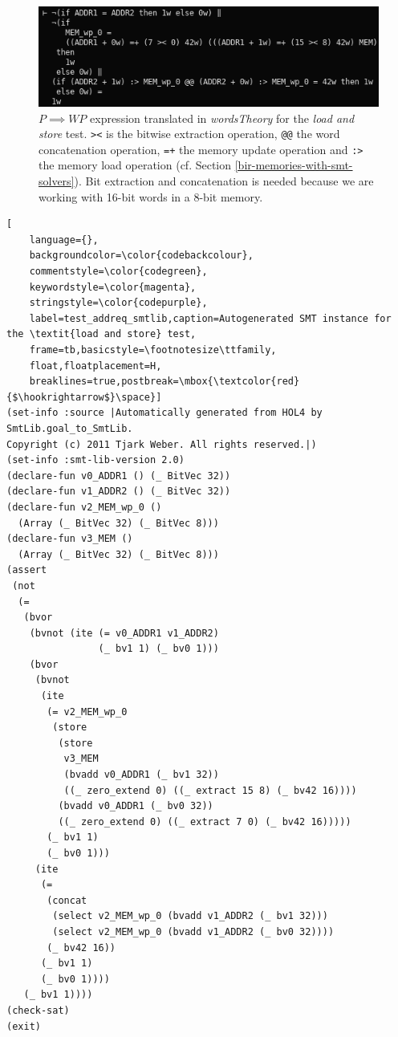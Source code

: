 \documentclass{kththesis}
\newcommand{\WP}{\ensuremath{\mathit{WP}}}
\begin{document}
{\begin{figure}[!h]
	\includegraphics[width=\textwidth]{figures/test_addreq_words.png}
	\centering
	\caption{$P \implies \WP$ expression translated in \textit{wordsTheory} for the \textit{load and store} test. \texttt{><} is the bitwise extraction operation, \texttt{@@} the word concatenation operation, \texttt{=+} the memory update operation and \texttt{:>} the memory load operation (cf. Section \ref{bir-memories-with-smt-solvers}). Bit extraction and concatenation is needed because we are working with 16-bit words in a 8-bit memory.}
	\label{test_addreq_words}
\end{figure}

\begin{lstlisting}[
    language={},
    backgroundcolor=\color{codebackcolour},
    commentstyle=\color{codegreen},
    keywordstyle=\color{magenta},
    stringstyle=\color{codepurple},
    label=test_addreq_smtlib,caption=Autogenerated SMT instance for the \textit{load and store} test,
    frame=tb,basicstyle=\footnotesize\ttfamily,
    float,floatplacement=H,
    breaklines=true,postbreak=\mbox{\textcolor{red}{$\hookrightarrow$}\space}]
(set-info :source |Automatically generated from HOL4 by SmtLib.goal_to_SmtLib.
Copyright (c) 2011 Tjark Weber. All rights reserved.|)
(set-info :smt-lib-version 2.0)
(declare-fun v0_ADDR1 () (_ BitVec 32))
(declare-fun v1_ADDR2 () (_ BitVec 32))
(declare-fun v2_MEM_wp_0 ()
  (Array (_ BitVec 32) (_ BitVec 8)))
(declare-fun v3_MEM ()
  (Array (_ BitVec 32) (_ BitVec 8)))
(assert
 (not
  (=
   (bvor
    (bvnot (ite (= v0_ADDR1 v1_ADDR2)
                (_ bv1 1) (_ bv0 1)))
    (bvor
     (bvnot
      (ite
       (= v2_MEM_wp_0
        (store
         (store
          v3_MEM
          (bvadd v0_ADDR1 (_ bv1 32))
          ((_ zero_extend 0) ((_ extract 15 8) (_ bv42 16))))
         (bvadd v0_ADDR1 (_ bv0 32))
         ((_ zero_extend 0) ((_ extract 7 0) (_ bv42 16)))))
       (_ bv1 1)
       (_ bv0 1)))
     (ite
      (=
       (concat
        (select v2_MEM_wp_0 (bvadd v1_ADDR2 (_ bv1 32)))
        (select v2_MEM_wp_0 (bvadd v1_ADDR2 (_ bv0 32))))
       (_ bv42 16))
      (_ bv1 1)
      (_ bv0 1))))
   (_ bv1 1))))
(check-sat)
(exit)
\end{lstlisting}

}
\end{document}
